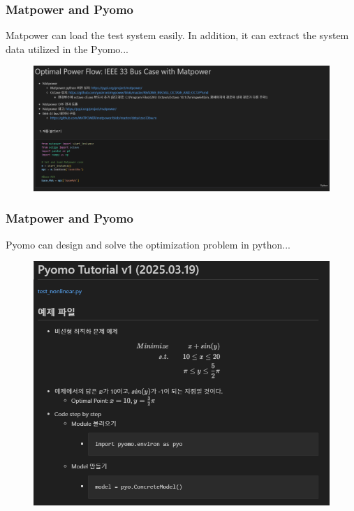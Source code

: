 \documentclass[
	11pt, %
	aspectratio=169, %
]{beamer}
\begin{document}
\begin{frame}
	\frametitle{Matpower and Pyomo}
	Matpower can load the test system easily. In addition, it can extract the system data utilized in the Pyomo...

	\begin{figure}
		\includegraphics[width=4 in,keepaspectratio]{matpower.png}
	\end{figure}

	
\end{frame}


\begin{frame}
	\frametitle{Matpower and Pyomo}
	Pyomo can design and solve the optimization problem in python...

	\begin{figure}
		\includegraphics[width=3 in,keepaspectratio]{pyomo.png}
	\end{figure}

\end{frame}

\end{document}
